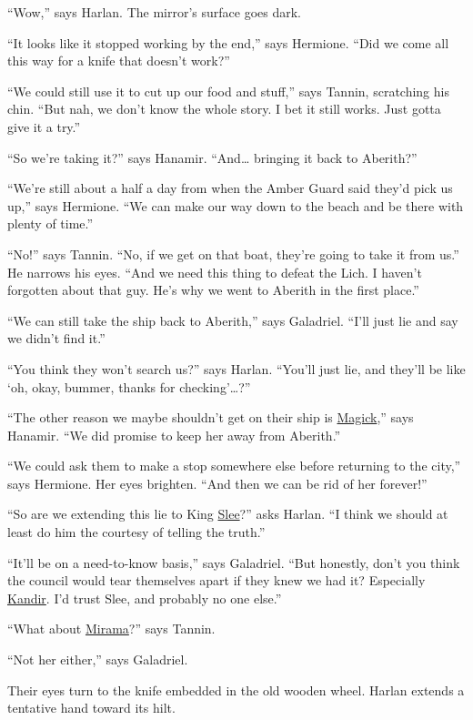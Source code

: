 \documentclass[smalldemyvopaper,11pt,twoside,onecolumn,openright,extrafontsizes]{memoir}
\begin{document}
``Wow,'' says Harlan. The mirror's surface goes dark.

``It looks like it stopped working by the end,'' says Hermione. ``Did we
come all this way for a knife that doesn't work?''

``We could still use it to cut up our food and stuff,'' says Tannin,
scratching his chin. ``But nah, we don't know the whole story. I bet it
still works. Just gotta give it a try.''

``So we're taking it?'' says Hanamir. ``And\ldots{} bringing it back to
Aberith?''

``We're still about a half a day from when the Amber Guard said they'd
pick us up,'' says Hermione. ``We can make our way down to the beach and
be there with plenty of time.''

``No!'' says Tannin. ``No, if we get on that boat, they're going to take
it from us.'' He narrows his eyes. ``And we need this thing to defeat
the Lich. I haven't forgotten about that guy. He's why we went to
Aberith in the first place.''

``We can still take the ship back to Aberith,'' says Galadriel. ``I'll
just lie and say we didn't find it.''

``You think they won't search us?'' says Harlan. ``You'll just lie, and
they'll be like `oh, okay, bummer, thanks for checking'\ldots?''

``The other reason we maybe shouldn't get on their ship is
\href{/characters/magick/}{Magick},'' says Hanamir. ``We did promise to
keep her away from Aberith.''

``We could ask them to make a stop somewhere else before returning to
the city,'' says Hermione. Her eyes brighten. ``And then we can be rid
of her forever!''

``So are we extending this lie to King \href{/characters/slee/}{Slee}?''
asks Harlan. ``I think we should at least do him the courtesy of telling
the truth.''

``It'll be on a need-to-know basis,'' says Galadriel. ``But honestly,
don't you think the council would tear themselves apart if they knew we
had it? Especially \href{/characters/kandir/}{Kandir}. I'd trust Slee,
and probably no one else.''

``What about \href{/characters/mirama/}{Mirama}?'' says Tannin.

``Not her either,'' says Galadriel.

Their eyes turn to the knife embedded in the old wooden wheel. Harlan
extends a tentative hand toward its hilt.
\end{document}
